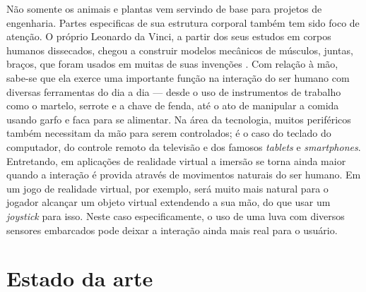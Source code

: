\documentclass[
	12pt,				%
	openright,			%
	oneside,			%
	a4paper,			%
	english,			%
	brazil				%
	]{abntex2}
\begin{document}
		Não somente os animais e plantas vem servindo de base para projetos de engenharia. Partes especificas de sua estrutura corporal também tem sido foco de atenção. O próprio Leonardo da Vinci, a partir dos seus estudos em corpos humanos dissecados, chegou a construir modelos mecânicos de músculos, juntas, braços, que foram usados em muitas de suas invenções \cite{rosheim2006leonardo}. Com relação à mão, sabe-se que ela exerce uma importante função na interação do ser humano com diversas ferramentas do dia a dia --- desde o uso de instrumentos de trabalho como o martelo, serrote e a chave de fenda, até o ato de manipular a comida usando garfo e faca para se alimentar. Na área da tecnologia, muitos periféricos também necessitam da mão para serem controlados; é o caso do teclado do computador, do controle remoto da televisão e dos famosos \textit{tablets} e \textit{smartphones}.	Entretando, em aplicações de realidade virtual a imersão se torna ainda maior quando a interação é provida através de movimentos naturais do ser humano. Em um jogo de realidade virtual, por exemplo, será muito mais natural para o jogador alcançar um objeto virtual extendendo a sua mão, do que usar um \textit{joystick} para isso. Neste caso especificamente, o uso de uma luva com diversos sensores embarcados pode deixar a interação ainda mais real para o usuário. 
	

		\section{Estado da arte}

\end{document}
